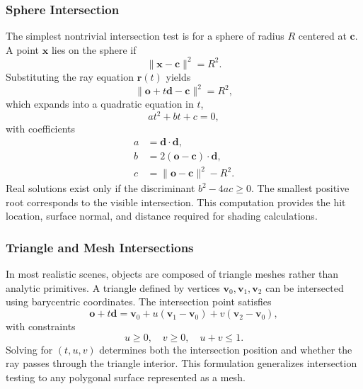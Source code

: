 \documentclass[11pt]{article}
\begin{document}
\subsubsection{Sphere Intersection}

The simplest nontrivial intersection test is for a sphere of radius $R$ centered at $\mathbf{c}$. A point $\mathbf{x}$ lies on the sphere if
\begin{equation}
\|\mathbf{x} - \mathbf{c}\|^2 = R^2.
\end{equation}
Substituting the ray equation $\mathbf{r}(t)$ yields
\begin{equation}
\|\mathbf{o} + t\mathbf{d} - \mathbf{c}\|^2 = R^2,
\end{equation}
which expands into a quadratic equation in $t$,
\begin{equation}
at^2 + bt + c = 0,
\end{equation}
with coefficients
\begin{align}
a &= \mathbf{d} \cdot \mathbf{d}, \\
b &= 2(\mathbf{o} - \mathbf{c}) \cdot \mathbf{d}, \\
c &= \|\mathbf{o} - \mathbf{c}\|^2 - R^2.
\end{align}
Real solutions exist only if the discriminant $b^2 - 4ac \geq 0$. The smallest positive root corresponds to the visible intersection. This computation provides the hit location, surface normal, and distance required for shading calculations.

\subsubsection{Triangle and Mesh Intersections}

In most realistic scenes, objects are composed of triangle meshes rather than analytic primitives. A triangle defined by vertices $\mathbf{v}_0, \mathbf{v}_1, \mathbf{v}_2$ can be intersected using barycentric coordinates. The intersection point satisfies
\begin{equation}
\mathbf{o} + t\mathbf{d} = \mathbf{v}_0 + u(\mathbf{v}_1 - \mathbf{v}_0) + v(\mathbf{v}_2 - \mathbf{v}_0),
\end{equation}
with constraints
\begin{equation}
u \geq 0, \quad v \geq 0, \quad u + v \leq 1.
\end{equation}
Solving for $(t, u, v)$ determines both the intersection position and whether the ray passes through the triangle interior. This formulation generalizes intersection testing to any polygonal surface represented as a mesh.
\end{document}
